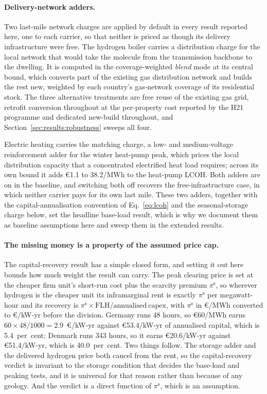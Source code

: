 \paragraph{Delivery-network adders.} Two last-mile network charges are applied by
default in every result reported here, one to each carrier, so that neither is priced as
though its delivery infrastructure were free. The hydrogen boiler carries a distribution
charge for the local network that would take the molecule from the transmission backbone
to the dwelling. It is computed in the coverage-weighted \emph{blend} mode at its
central bound, which converts part of the existing gas distribution network and builds
the rest new, weighted by each country's gas-network coverage of its residential stock.
The three alternative treatments are free reuse of the existing gas grid, retrofit
conversion throughout at the per-property cost reported by the H21 programme
\citep{NorthernGasNetworks2018h21} and dedicated new-build throughout, and
Section~\ref{sec:results:robustness} sweeps all four.

Electric heating carries the matching charge, a low- and medium-voltage reinforcement
adder for the winter heat-pump peak, which prices the local distribution capacity that a
concentrated electrified heat load requires; across its own bound it adds \euro{}1.1 to
38.2/MWh to the heat-pump LCOH. Both adders are on in the baseline, and switching both
off recovers the free-infrastructure case, in which neither carrier pays for its own
last mile. These two adders, together with the
capital-annualisation convention of Eq.~\eqref{eq:lcoh} and the seasonal-storage charge
below, set the headline base-load result, which is why we document them as baseline
assumptions here and sweep them in the extended results.

\paragraph{The missing money is a property of the assumed price cap.} The capital-recovery result has a simple closed form, and setting it out here bounds how much weight the result can carry. The peak clearing price is set at the cheaper firm
unit's short-run cost plus the scarcity premium $\pi^{\mathrm{s}}$, so wherever hydrogen
is the cheaper unit its inframarginal rent is exactly $\pi^{\mathrm{s}}$ per megawatt-hour
and its recovery is $\pi^{\mathrm{s}} \times \mathrm{FLH} / \mathrm{annualised\ capex}$,
with $\pi^{\mathrm{s}}$ in \euro{}/MWh converted to \euro{}/kW-yr before the division.
Germany runs 48 hours, so \euro{}60/MWh earns $60\times48/1000 = 2.9$~\euro{}/kW-yr
against \euro{}53.4/kW-yr of annualised capital, which is 5.4~per~cent; Denmark runs
343 hours, so it earns \euro{}20.6/kW-yr against \euro{}51.4/kW-yr, which is
40.0~per~cent. Two things follow. The storage adder and the delivered hydrogen
price both cancel from the rent, so the capital-recovery verdict is invariant to the
storage condition that decides the base-load and peaking tests, and it is universal for that reason
rather than because of any geology. And the verdict is a direct function of
$\pi^{\mathrm{s}}$, which is an assumption.

